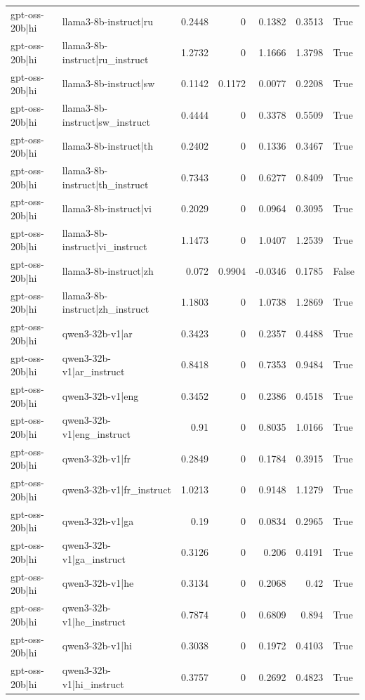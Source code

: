 \begin{table}
\begin{tabular}{l l r r r r l}
gpt-oss-20b|hi & llama3-8b-instruct|ru & 0.2448 & 0 & 0.1382 & 0.3513 & True \\
gpt-oss-20b|hi & llama3-8b-instruct|ru_instruct & 1.2732 & 0 & 1.1666 & 1.3798 & True \\
gpt-oss-20b|hi & llama3-8b-instruct|sw & 0.1142 & 0.1172 & 0.0077 & 0.2208 & True \\
gpt-oss-20b|hi & llama3-8b-instruct|sw_instruct & 0.4444 & 0 & 0.3378 & 0.5509 & True \\
gpt-oss-20b|hi & llama3-8b-instruct|th & 0.2402 & 0 & 0.1336 & 0.3467 & True \\
gpt-oss-20b|hi & llama3-8b-instruct|th_instruct & 0.7343 & 0 & 0.6277 & 0.8409 & True \\
gpt-oss-20b|hi & llama3-8b-instruct|vi & 0.2029 & 0 & 0.0964 & 0.3095 & True \\
gpt-oss-20b|hi & llama3-8b-instruct|vi_instruct & 1.1473 & 0 & 1.0407 & 1.2539 & True \\
gpt-oss-20b|hi & llama3-8b-instruct|zh & 0.072 & 0.9904 & -0.0346 & 0.1785 & False \\
gpt-oss-20b|hi & llama3-8b-instruct|zh_instruct & 1.1803 & 0 & 1.0738 & 1.2869 & True \\
gpt-oss-20b|hi & qwen3-32b-v1|ar & 0.3423 & 0 & 0.2357 & 0.4488 & True \\
gpt-oss-20b|hi & qwen3-32b-v1|ar_instruct & 0.8418 & 0 & 0.7353 & 0.9484 & True \\
gpt-oss-20b|hi & qwen3-32b-v1|eng & 0.3452 & 0 & 0.2386 & 0.4518 & True \\
gpt-oss-20b|hi & qwen3-32b-v1|eng_instruct & 0.91 & 0 & 0.8035 & 1.0166 & True \\
gpt-oss-20b|hi & qwen3-32b-v1|fr & 0.2849 & 0 & 0.1784 & 0.3915 & True \\
gpt-oss-20b|hi & qwen3-32b-v1|fr_instruct & 1.0213 & 0 & 0.9148 & 1.1279 & True \\
gpt-oss-20b|hi & qwen3-32b-v1|ga & 0.19 & 0 & 0.0834 & 0.2965 & True \\
gpt-oss-20b|hi & qwen3-32b-v1|ga_instruct & 0.3126 & 0 & 0.206 & 0.4191 & True \\
gpt-oss-20b|hi & qwen3-32b-v1|he & 0.3134 & 0 & 0.2068 & 0.42 & True \\
gpt-oss-20b|hi & qwen3-32b-v1|he_instruct & 0.7874 & 0 & 0.6809 & 0.894 & True \\
gpt-oss-20b|hi & qwen3-32b-v1|hi & 0.3038 & 0 & 0.1972 & 0.4103 & True \\
gpt-oss-20b|hi & qwen3-32b-v1|hi_instruct & 0.3757 & 0 & 0.2692 & 0.4823 & True \\

\end{tabular}
\end{table}
